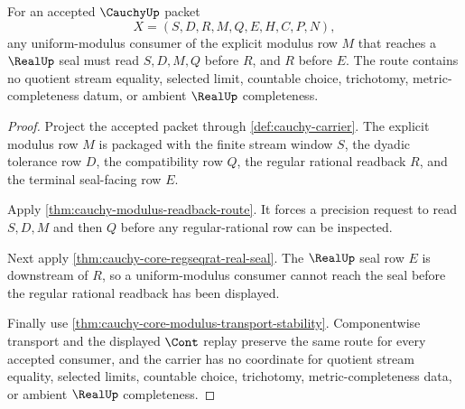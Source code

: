\begin{theorem}
\label{thm:cauchy-uniform-modulus-real-seal}
For an accepted $\CauchyUp$ packet
$$
X=(S,D,R,M,Q,E,H,C,P,N),
$$
any uniform-modulus consumer of the explicit modulus row $M$ that reaches a $\RealUp$ seal must read $S,D,M,Q$ before $R$, and $R$ before $E$. The route contains no quotient stream equality, selected limit, countable choice, trichotomy, metric-completeness datum, or ambient $\RealUp$ completeness.
\end{theorem}
\begin{proof}
Project the accepted packet through \autoref{def:cauchy-carrier}. The explicit modulus row $M$ is packaged with the finite stream window $S$, the dyadic tolerance row $D$, the compatibility row $Q$, the regular rational readback $R$, and the terminal seal-facing row $E$.

Apply \autoref{thm:cauchy-modulus-readback-route}. It forces a precision request to read $S,D,M$ and then $Q$ before any regular-rational row can be inspected.

Next apply \autoref{thm:cauchy-core-regseqrat-real-seal}. The $\RealUp$ seal row $E$ is downstream of $R$, so a uniform-modulus consumer cannot reach the seal before the regular rational readback has been displayed.

Finally use \autoref{thm:cauchy-core-modulus-transport-stability}. Componentwise transport and the displayed $\Cont$ replay preserve the same route for every accepted consumer, and the carrier has no coordinate for quotient stream equality, selected limits, countable choice, trichotomy, metric-completeness data, or ambient $\RealUp$ completeness.
\end{proof}
